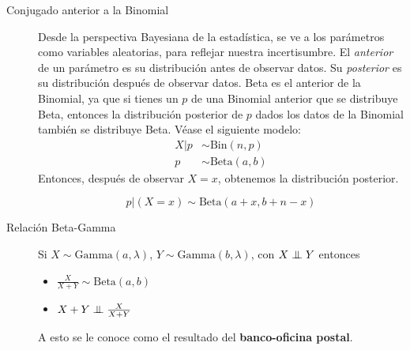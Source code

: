 \documentclass[12,landscape]{article}
\makeatletter
\newcommand\independent{\protect\mathpalette{\protect\independenT}{\perp}}
\def\independenT#1#2{\mathrel{\setbox0\hbox{$#1#2$}%
    \copy0\kern-\wd0\mkern4mu\box0}}
\newcommand{\N}{\mathcal{N}}
\newcommand{\Bin}{\textrm{Bin}}
\newcommand{\Beta}{\textrm{Beta}}
\newcommand{\Gam}{\textrm{Gamma}}
\newcommand{\Expo}{\textrm{Expo}}
\renewcommand{\subsection}{\@startsection{subsection}{2}{0mm}%
                                {-1explus -.5ex minus -.2ex}%
                                {0.5ex plus .2ex}%
                                {\normalfont\normalsize\bfseries}}
\makeatother
\begin{document}
\begin{multicols*}{3}
\begin{description}
\item[Conjugado anterior a la Binomial] Desde la perspectiva Bayesiana de la estadística, se ve a los parámetros como variables aleatorias, para reflejar nuestra incertisumbre. El \emph{anterior} de un parámetro es su distribución antes de observar datos. Su \emph{posterior} es su distribución después de observar datos. Beta es el anterior de la Binomial, ya que si tienes un $p$ de una Binomial anterior que se distribuye Beta, entonces la distribución posterior de $p$ dados los datos de la Binomial también se distribuye Beta. Véase el siguiente modelo: 
    \begin{align*}
        X|p &\sim \Bin(n, p) \\
        p &\sim \Beta(a, b)
    \end{align*}
Entonces, después de observar $X = x$, obtenemos la distribución posterior.

\[p|(X=x) \sim \Beta(a + x, b + n - x) \]

\item[Relación Beta-Gamma] Si $X \sim \Gam(a, \lambda)$, $Y \sim \Gam(b, \lambda)$, con $X \independent Y$ entonces
    \begin{itemize}
    	\item $\frac{X}{X + Y} \sim \Beta(a, b)$
    	\item $X + Y \independent \frac{X}{X + Y}$
    \end{itemize}
    A esto se le conoce como el resultado del \textbf{banco-oficina postal}.
\end{description}




%

\end{multicols*}
\end{document}
